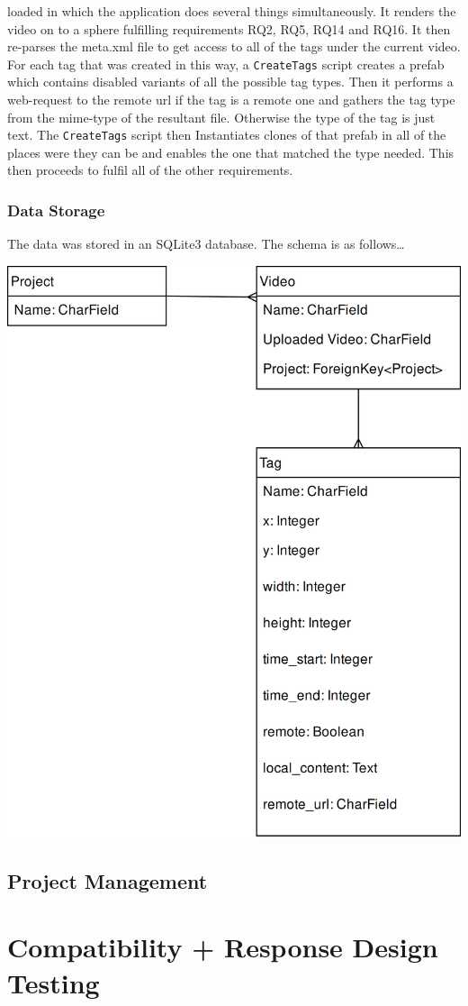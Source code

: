 \documentclass[12pt]{report}
\newcommand{\inlinecode}{\texttt}
\begin{document}
loaded in which the application does several things simultaneously. It renders
the video on to a sphere fulfilling requirements RQ2, RQ5, RQ14 and RQ16. It then
re-parses the meta.xml file to get access to all of the tags under the current
video. For each tag that was created in this way, a \inlinecode{CreateTags}
script creates a prefab which contains disabled variants of all the possible
tag types. Then it performs a web-request to the remote url if the tag is a
remote one and gathers the tag type from the mime-type of the resultant file.
Otherwise the type of the tag is just text. The \inlinecode{CreateTags} script
then Instantiates clones of that prefab in all of the places were they can be
and enables the one that matched the type needed. This then proceeds to fulfil
all of the other requirements.

\subsection{Data Storage}
The data was stored in an SQLite3 database. The schema is as follows\ldots

\includegraphics[height=\textwidth]{er_diagram}
\clearpage

\section{Project Management}
\chapter{Compatibility + Response Design Testing}
\end{document}
